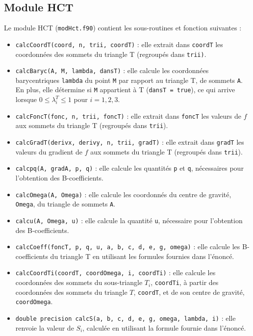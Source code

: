 \documentclass[12 pt]{article}
\begin{document}
\subsection{Module HCT}
Le module HCT (\texttt{modHct.f90}) contient les sous-routines et fonction suivantes :
\begin{itemize}
	\item \texttt{calcCoordT(coord, n, trii, coordT)} : elle extrait dans \texttt{coordT} les coordonnées des sommets du triangle T (regroupés dans \texttt{trii)}.
	\item \texttt{calcBaryc(A, M, lambda, dansT)} : elle calcule les coordonnées barycentriques \texttt{lambda} du point \texttt{M} par rapport au triangle T, de sommets \texttt{A}. En plus, elle détermine si \texttt{M} appartient à T (\texttt{dansT = true}), ce qui arrive lorsque $ 0 \leq \lambda_i^T \leq 1$ pour $i = 1, 2, 3$.
	\item \texttt{calcFoncT(fonc, n, trii, foncT)} : elle extrait dans \texttt{foncT} les valeurs de $f$ aux sommets du triangle T (regroupés dans \texttt{trii}).
	\item \texttt{calcGradT(derivx, derivy, n, trii, gradT)} : elle extrait dans \texttt{gradT} les valeurs du gradient de $f$ aux sommets du triangle T (regroupés dans \texttt{trii}).
	\item \texttt{calcpq(A, gradA, p, q)} : elle calcule les quantités \texttt{p} et \texttt{q}, nécessaires pour l'obtention des B-coefficients.
	\item \texttt{calcOmega(A, Omega)} : elle calcule les coordonnés du centre de gravité, \texttt{Omega}, du triangle de sommets \texttt{A}.
	\item \texttt{calcu(A, Omega, u)} : elle calcule la quantité \texttt{u}, nécessaire pour l'obtention des B-coefficients.
	\item \texttt{calcCoeff(foncT, p, q, u, a, b, c, d, e, g, omega)} : elle calcule les B-coefficients du triangle T en utilisant les formules fournies dans l'énoncé.
	\item \texttt{calcCoordTi(coordT, coordOmega, i, coordTi)} : elle calcule les coordonnées des sommets du sous-triangle $T_i$, \texttt{coordTi}, à partir des coordonnées des sommets du triangle $T$, \texttt{coordT}, et de son centre de gravité, \texttt{coordOmega}.
	\item \texttt{double precision calcS(a, b, c, d, e, g, omega, lambda, i)} : elle renvoie la valeur de $S_i$, calculée en utilisant la formule fournie dans l'énoncé.

\end{itemize}
\end{document}
